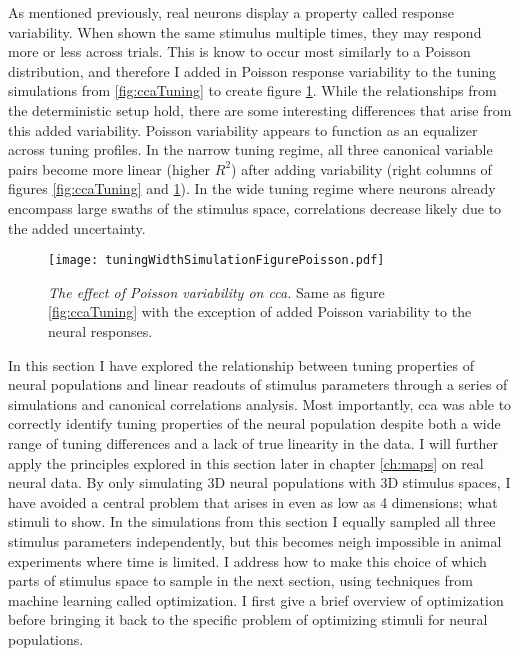 As mentioned previously, real neurons display a property called response variability. When shown the same stimulus multiple times, they may respond more or less across trials. This is know to occur most similarly to a Poisson distribution, and therefore I added in Poisson response variability to the tuning simulations from \ref{fig:ccaTuning} to create figure \ref{fig:ccaTuningPoiss}. While the relationships from the deterministic setup hold, there are some interesting differences that arise from this added variability. Poisson variability appears to function as an equalizer across tuning profiles. In the narrow tuning regime, all three canonical variable pairs become more linear (higher $R^2$) after adding variability (right columns of figures \ref{fig:ccaTuning} and \ref{fig:ccaTuningPoiss}). In the wide tuning regime where neurons already encompass large swaths of the stimulus space, correlations decrease likely due to the added uncertainty.


	\begin{figure}
		\centering
		\texttt{[image: tuningWidthSimulationFigurePoisson.pdf]}
		{\caption{{\it The effect of Poisson variability on \gls{cca}.} Same as figure \ref{fig:ccaTuning} with the exception of added Poisson variability to the neural responses.}
		\label{fig:ccaTuningPoiss}}
	\end{figure}

In this section I have explored the relationship between tuning properties of neural populations and linear readouts of stimulus parameters through a series of simulations and canonical correlations analysis. Most importantly, \gls{cca} was able to correctly identify tuning properties of the neural population despite both a wide range of tuning differences and a lack of true linearity in the data. I will further apply the principles explored in this section later in chapter \ref{ch:maps} on real neural data. By only simulating 3D neural populations with 3D stimulus spaces, I have avoided a central problem that arises in even as low as 4 dimensions; what stimuli to show. In the simulations from this section I equally sampled all three stimulus parameters independently, but this becomes neigh impossible in animal experiments where time is limited. I address how to make this choice of which parts of stimulus space to sample in the next section, using techniques from machine learning called optimization. I first give a brief overview of optimization before bringing it back to the specific problem of optimizing stimuli for neural populations. 

